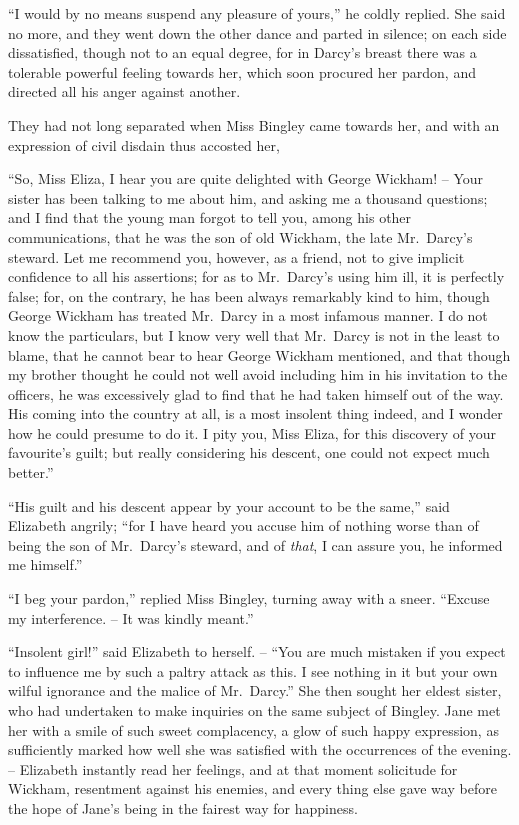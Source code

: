 “I would by no means suspend any pleasure of yours,”
he coldly replied. She said no more, and they went down
the other dance and parted in silence; on each side
dissatisfied, though not to an equal degree, for in Darcy’s
breast there was a tolerable powerful feeling towards her,
which soon procured her pardon, and directed all his anger
against another.

They had not long separated when Miss Bingley came
towards her, and with an expression of civil disdain thus
accosted her,

“So, Miss Eliza, I hear you are quite delighted with
George Wickham! -- Your sister has been talking to me
about him, and asking me a thousand questions; and
I find that the young man forgot to tell you, among his
other communications, that he was the son of old Wickham,
the late Mr.\ Darcy’s steward. Let me recommend you,
however, as a friend, not to give implicit confidence to all
his assertions; for as to Mr.\ Darcy’s using him ill, it is
perfectly false; for, on the contrary, he has been always
remarkably kind to him, though George Wickham has
treated Mr.\ Darcy in a most infamous manner. I do not
know the particulars, but I know very well that Mr.\ Darcy
is not in the least to blame, that he cannot bear to hear
George Wickham mentioned, and that though my brother
thought he could not well avoid including him in his
invitation to the officers, he was excessively glad to find
that he had taken himself out of the way. His coming
into the country at all, is a most insolent thing indeed,
and I wonder how he could presume to do it. I pity you,
Miss Eliza, for this discovery of your favourite’s guilt;
but really considering his descent, one could not expect
much better.”

“His guilt and his descent appear by your account to
be the same,” said Elizabeth angrily; “for I have heard
you accuse him of nothing worse than of being the son
of Mr.\ Darcy’s steward, and of \textit{that}, I can assure you, he
informed me himself.”

“I beg your pardon,” replied Miss Bingley, turning
away with a sneer. “Excuse my interference. -- It was
kindly meant.”

“Insolent girl!” said Elizabeth to herself. -- “You are
much mistaken if you expect to influence me by such
a paltry attack as this. I see nothing in it but your own
wilful ignorance and the malice of Mr.\ Darcy.” She then
sought her eldest sister, who had undertaken to make
inquiries on the same subject of Bingley. Jane met her
with a smile of such sweet complacency, a glow of such
happy expression, as sufficiently marked how well she was
satisfied with the occurrences of the evening. -- Elizabeth
instantly read her feelings, and at that moment solicitude
for Wickham, resentment against his enemies, and every
thing else gave way before the hope of Jane’s being in the
fairest way for happiness.

